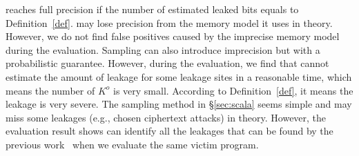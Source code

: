 \tool{} reaches full precision if the number of estimated leaked bits 
equals to Definition~\ref{def}. 
\tool{} may lose precision from the 
memory model it uses in theory. However, we do not find false positives 
caused by the imprecise memory model during the evaluation. 
Sampling can also introduce imprecision but with a probabilistic guarantee. 
However, during the evaluation, we find that \tool{} cannot estimate 
the amount of leakage for some leakage sites in a reasonable time, 
which means the number of $K^o$ is very small. According to Definition~\ref{def}, 
it means the leakage is very severe. The sampling method in \S\ref{sec:scala} seems
simple and may miss some leakages (e.g., chosen ciphertext attacks) in theory. 
However, the evaluation result 
shows \tool{} can identify all the leakages that can be found by the previous work~\cite{203878,236338,Brotzman19Casym}
when we evaluate the same victim program.

